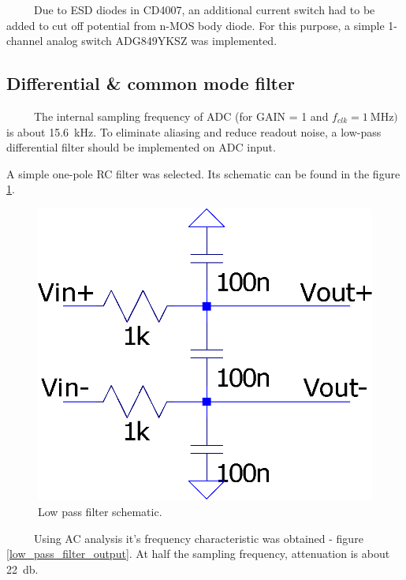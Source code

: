        Due to ESD diodes in CD4007, an additional current switch had to be added to cut off potential from n-MOS body diode. For this purpose, a simple 1-channel analog switch ADG849YKSZ was implemented.

    \subsection{Differential \& common mode filter}
        The internal sampling frequency of ADC (for GAIN = 1 and $f_{clk} = \SI{1}{\mega\hertz})$ is about \SI{15.6}{\kilo\hertz}. To eliminate aliasing and reduce readout noise, a low-pass differential filter should be implemented on ADC input.

        A simple one-pole RC filter was selected. Its schematic can be found in the figure \ref{low_pass_filter}.

        \begin{figure}[H]
            \centering
            \includegraphics[width=0.3\paperwidth]{img/06/low_pass_filter.eps}
            \caption{Low pass filter schematic.}
            \label{low_pass_filter}
        \end{figure}

        Using AC analysis it's frequency characteristic was obtained - figure \ref{low_pass_filter_output}. At half the sampling frequency, attenuation is about \SI{22}{\decibel}.

